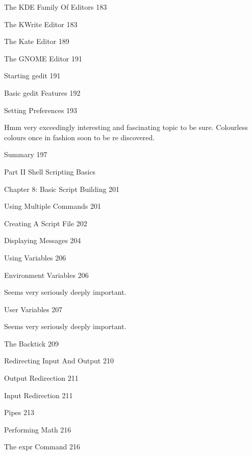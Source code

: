 The KDE Family Of Editors 183



The KWrite Editor 183



The Kate Editor 189



The GNOME Editor 191



Starting gedit 191



Basic gedit Features 192



Setting Preferences 193

Hmm very exceedingly interesting and fascinating topic to be sure. Colourless colours once in fashion soon to be re discovered.

Summary 197



Part II Shell Scripting Basics



Chapter 8: Basic Script Building 201



Using Multiple Commands 201



Creating A Script File 202



Displaying Messages 204



Using Variables 206



Environment Variables 206

Seems very seriously deeply important.

User Variables 207

Seems very seriously deeply important.

The Backtick 209



Redirecting Input And Output 210



Output Redirection 211



Input Redirection 211



Pipes 213



Performing Math 216



The expr Command 216



